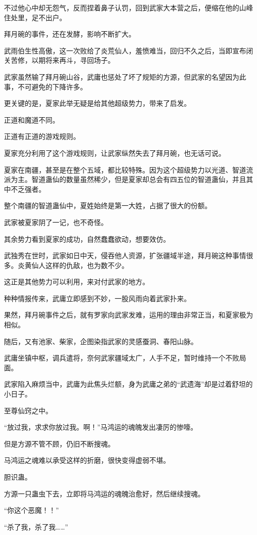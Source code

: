 \begin{this_body}
不过他心中却无怨气，反而捏着鼻子认罚，回到武家大本营之后，便缩在他的山峰住处里，足不出户。

拜月碗的事件，还在发酵，影响不断扩大。

武雨伯生性高傲，这一次败给了炎荒仙人，羞愤难当，回归不久之后，当即宣布闭关苦修，以期将来再斗，寻回场子。

武家虽然输了拜月碗山谷，武庸也惩处了坏了规矩的方源，但武家的名望因为此事，不可避免的下降许多。

更关键的是，夏家此举无疑是给其他超级势力，带来了启发。

正道和魔道不同。

正道有正道的游戏规则。

夏家充分利用了这个游戏规则，让武家纵然失去了拜月碗，也无话可说。

夏家在南疆，甚至是在整个五域，都比较特殊。因为这个超级势力以光道、智道流派为主。智道蛊仙的数量虽然稀少，但是夏家却总会有四五位的智道蛊仙，并且其中不乏强者。

整个南疆的智道蛊仙中，夏姓始终是第一大姓，占据了很大的份额。

武家被夏家阴了一记，也不奇怪。

其余势力看到夏家的成功，自然蠢蠢欲动，想要效仿。

武独秀在世时，武家如日中天，侵吞他人资源，扩张疆域半途，拜月碗这种事情很多。炎黄仙人这样的仇敌，也为数不少。

这正是其他势力可以利用，来对付武家的地方。

种种情报传来，武庸立即感到不妙，一股风雨向着武家扑来。

果然，拜月碗事件之后，就有罗家向武家发难，运用的理由非常正当，和夏家极为相似。

随后，又有池家、柴家，企图染指武家的灵感蚕洞、春阳山脉。

武庸坐镇中枢，调兵遣将，奈何武家疆域太广，人手不足，暂时维持一个不败局面。

武家陷入麻烦当中，武庸为此焦头烂额，身为武庸之弟的“武遗海”却是过着舒坦的小日子。

至尊仙窍之中。

“放过我，求求你放过我。啊！”马鸿运的魂魄发出凄厉的惨嚎。

但是方源不管不顾，仍旧不断搜魂。

马鸿运之魂难以承受这样的折磨，很快变得虚弱不堪。

胆识蛊。

方源一只蛊虫下去，立即将马鸿运的魂魄治愈好，然后继续搜魂。

“你这个恶魔！！”

“杀了我，杀了我……”


\end{this_body}
